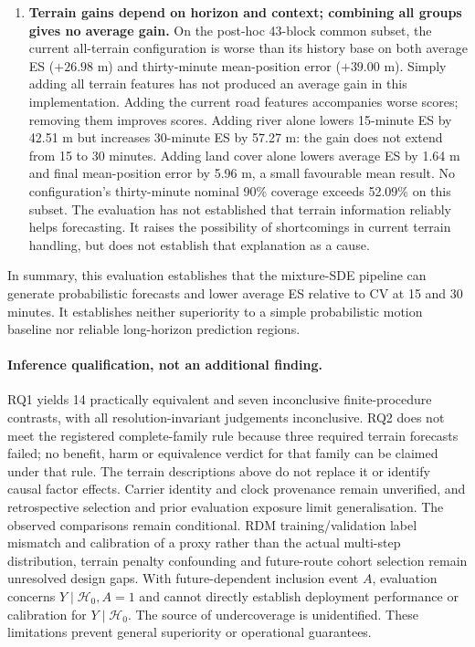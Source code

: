 \begin{enumerate}
\item \textbf{Terrain gains depend on horizon and context; combining all groups gives no average gain.}
On the post-hoc 43-block common subset, the current all-terrain configuration
is worse than its history base on both average ES ($+26.98$ m) and
thirty-minute mean-position error ($+39.00$ m). Simply adding all terrain
features has not produced an average gain in this implementation. Adding
the current road features accompanies worse scores; removing them improves
scores. Adding river alone lowers 15-minute ES by 42.51 m but increases
30-minute ES by 57.27 m: the gain does not extend from 15 to 30 minutes.
Adding land cover alone lowers average ES by 1.64 m and final
mean-position error by 5.96 m, a small favourable mean result. No configuration's
thirty-minute nominal 90\% coverage exceeds 52.09\% on this subset.
The evaluation has not established that terrain information reliably helps
forecasting. It raises the possibility of shortcomings in current terrain
handling, but does not establish that explanation as a cause.
\end{enumerate}

In summary, this evaluation establishes that the mixture-SDE pipeline can
generate probabilistic forecasts and lower average ES relative to CV at
15 and 30 minutes. It establishes neither superiority to a simple
probabilistic motion baseline nor reliable long-horizon prediction regions.

\paragraph{Inference qualification, not an additional finding.}
RQ1 yields 14 practically equivalent and seven inconclusive finite-procedure
contrasts, with all resolution-invariant judgements inconclusive. RQ2 does
not meet the registered complete-family rule because three required terrain
forecasts failed; no benefit, harm or equivalence verdict for that family
can be claimed under that rule. The terrain descriptions above do not
replace it or identify causal factor effects. Carrier identity and clock
provenance remain unverified, and retrospective selection and prior evaluation
exposure limit generalisation. The observed comparisons remain conditional.
RDM training/validation label mismatch and calibration of a proxy rather
than the actual multi-step distribution, terrain penalty confounding and
future-route cohort selection remain unresolved design gaps.
With future-dependent inclusion event $A$, evaluation concerns
$Y\mid\mathcal H_0,A=1$ and cannot directly establish deployment performance
or calibration for $Y\mid\mathcal H_0$. The source of undercoverage is unidentified.
These limitations prevent general superiority or operational guarantees.

